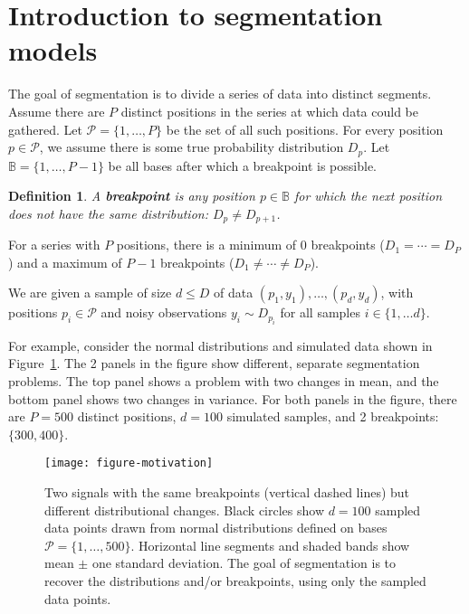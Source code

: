 \documentclass{jsfds} %
\newtheorem{definition}{Definition}
\begin{document}
  \begin{AMSclass}
  \end{AMSclass}
 
\newpage

\section{Introduction to segmentation models}

The goal of segmentation is to divide a series of data into distinct
segments. Assume there are $P$ distinct positions in the series at
which data could be gathered. Let $\mathcal P= \{1,\dots,P\}$ be the
set of all such positions. For every position $p\in\mathcal P$, we
assume there is some true probability distribution $D_p$. Let $\mathbb
B=\{1,\dots,P-1\}$ be all bases after which a breakpoint is possible.

\begin{definition}
  A \textbf{breakpoint} is any position $p\in\mathbb B$ for which the
  next position does not have the same distribution: $D_p \neq
  D_{p+1}$. 
\end{definition}

For a series with $P$ positions, there is a minimum of 0 breakpoints
($D_1=\cdots=D_P$) and a maximum of $P-1$ breakpoints ($D_1 \neq
\cdots \neq D_P$).

We are given a sample of size $d \leq D$ of data $(p_1, y_1), \dots,
(p_d, y_d)$, with positions $p_i\in\mathcal P$ and noisy observations
$y_i\sim D_{p_i}$ for all samples $i\in\{1, \dots d\}$. 

For example, consider the normal distributions and simulated data
shown in Figure~\ref{fig:motivation}. The 2 panels in the figure show
different, separate segmentation problems. The top panel shows a
problem with two changes in mean, and the bottom panel shows two
changes in variance. For both panels in the figure, there are $P=500$
distinct positions, $d=100$ simulated samples, and 2 breakpoints:
$\{300, 400\}$.

\begin{figure}[h!]
  \centering
  \texttt{[image: figure-motivation]}
  \vskip -0.5cm
  \caption{Two signals with the same breakpoints (vertical dashed
    lines) but different distributional changes. Black circles show
    $d=100$ sampled data points drawn from normal distributions
    defined on bases $\mathcal P=\{1, \dots, 500\}$. Horizontal line
    segments and shaded bands show mean $\pm$ one standard
    deviation. The goal of segmentation is to recover the
    distributions and/or breakpoints, using only the sampled data
    points.}
  \label{fig:motivation}
\end{figure}
\end{document}
